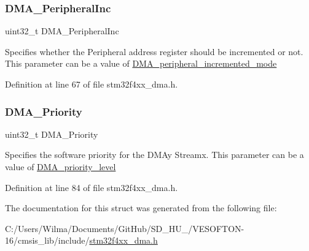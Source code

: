 \subsubsection{\texorpdfstring{D\+M\+A\+\_\+\+Peripheral\+Inc}{DMA\_PeripheralInc}}
{\footnotesize\ttfamily uint32\+\_\+t D\+M\+A\+\_\+\+Peripheral\+Inc}

Specifies whether the Peripheral address register should be incremented or not. This parameter can be a value of \hyperlink{group___d_m_a__peripheral__incremented__mode}{D\+M\+A\+\_\+peripheral\+\_\+incremented\+\_\+mode} 

Definition at line 67 of file stm32f4xx\+\_\+dma.\+h.

\mbox{\label{struct_d_m_a___init_type_def_aabb62e3f5536fc15a201058a1b6bda18}} 
\subsubsection{\texorpdfstring{D\+M\+A\+\_\+\+Priority}{DMA\_Priority}}
{\footnotesize\ttfamily uint32\+\_\+t D\+M\+A\+\_\+\+Priority}

Specifies the software priority for the D\+M\+Ay Streamx. This parameter can be a value of \hyperlink{group___d_m_a__priority__level}{D\+M\+A\+\_\+priority\+\_\+level} 

Definition at line 84 of file stm32f4xx\+\_\+dma.\+h.



The documentation for this struct was generated from the following file\+:\begin{DoxyCompactItemize}
\item 
C\+:/\+Users/\+Wilma/\+Documents/\+Git\+Hub/\+S\+D\+\_\+\+H\+U\+\_/\+V\+E\+S\+O\+F\+T\+O\+N-\/16/cmsis\+\_\+lib/include/\hyperlink{stm32f4xx__dma_8h}{stm32f4xx\+\_\+dma.\+h}\end{DoxyCompactItemize}
